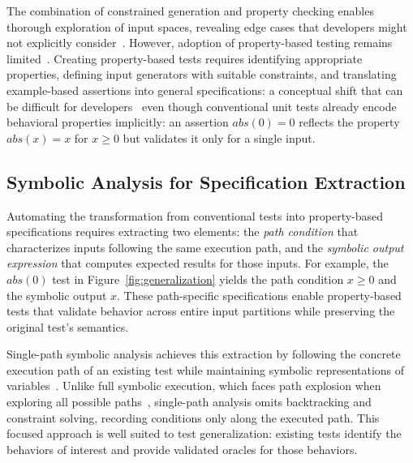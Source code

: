 The combination of constrained generation and property checking
enables thorough exploration of input spaces,
revealing edge cases
that developers might not explicitly consider~\cite{hughes_2016_experiences,maciver_2019_hypothesis}.
However, adoption of property-based testing remains limited~\cite{goldstein_2024_pbt_practice}.
Creating property-based tests requires identifying appropriate properties,
defining input generators with suitable constraints,
and translating example-based assertions into general specifications: a conceptual shift
that can be difficult for developers~\cite{barr_2015_oracle,tillmann_2005_parameterized}
even though conventional unit tests already encode behavioral properties implicitly:
an assertion $abs(0) = 0$ reflects the property $abs(x) = x$ for $x \geq 0$
but validates it only for a single input.

\subsection{Symbolic Analysis for Specification Extraction}
\label{sec:symbolic-analysis}

Automating the transformation from conventional tests into property-based specifications
requires extracting two elements:
the \emph{path condition} that characterizes inputs following the same execution path,
and the \emph{symbolic output expression} that computes expected results for those inputs.
For example, the $abs(0)$ test in Figure~\ref{fig:generalization} yields
the path condition $x \geq 0$ and the symbolic output $x$.
These path-specific specifications enable property-based tests that validate behavior
across entire input partitions while preserving the original test's semantics.

Single-path symbolic analysis achieves this extraction by following the concrete execution path of an existing test
while maintaining symbolic representations of variables~\cite{pasareanu_2013_symbolic}.
Unlike full symbolic execution, which faces path explosion
when exploring all possible paths~\cite{baldoni_2018_survey,cadar_2013_symbolic},
single-path analysis omits backtracking and constraint solving,
recording conditions only along the executed path.
This focused approach is well suited to test generalization:
existing tests identify the behaviors of interest
and provide validated oracles for those behaviors.

